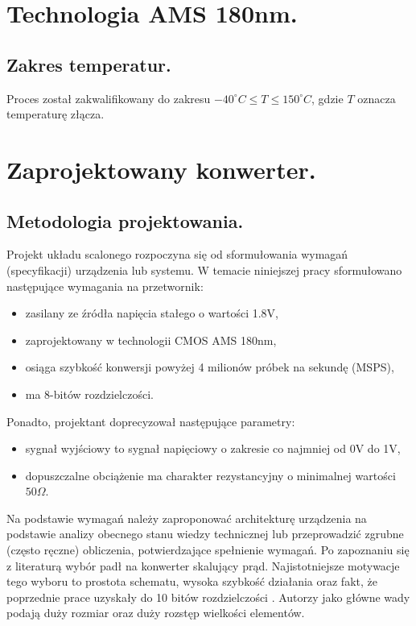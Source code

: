 \documentclass[10pt,a4paper]{report}
\begin{document}
	\chapter{Technologia AMS 180nm.}
	
	\section{Zakres temperatur.}
	{	Proces został zakwalifikowany do zakresu $-40^\circ C \leq T \leq 150^\circ C$, gdzie $T$ oznacza temperaturę złącza. }

	\section{}
	
	\chapter{Zaprojektowany konwerter.}
	\section{Metodologia projektowania.}
	{	Projekt układu scalonego rozpoczyna się od sformułowania wymagań (specyfikacji) urządzenia lub systemu. W temacie niniejszej pracy 	sformułowano następujące wymagania na przetwornik:
		\begin{itemize}
			\item zasilany ze źródła napięcia stałego o wartości 1.8V,
			\item zaprojektowany w technologii CMOS AMS 180nm,
			\item osiąga szybkość konwersji powyżej 4 milionów próbek na sekundę (MSPS),
			\item ma 8-bitów rozdzielczości.
		\end{itemize} 
		Ponadto, projektant doprecyzował następujące parametry:
		\begin{itemize}
			\item sygnał wyjściowy to sygnał napięciowy o zakresie co najmniej od 0V do 1V,
			\item dopuszczalne obciążenie ma charakter rezystancyjny o minimalnej wartości $50\Omega$.
		\end{itemize} }
	
	{	Na podstawie wymagań należy zaproponować architekturę urządzenia na podstawie analizy obecnego stanu wiedzy technicznej lub przeprowadzić zgrubne (często ręczne) obliczenia, potwierdzające spełnienie wymagań. Po zapoznaniu się z literaturą wybór padł na konwerter skalujący prąd. Najistotniejsze motywacje tego wyboru to prostota schematu, wysoka szybkość działania \cite{cmosanal} oraz fakt, że poprzednie prace uzyskały do 10 bitów rozdzielczości \cite{plassche}.	Autorzy \cite{cmosanal} jako główne wady podają duży rozmiar oraz duży rozstęp wielkości elementów.}
	
\end{document}
